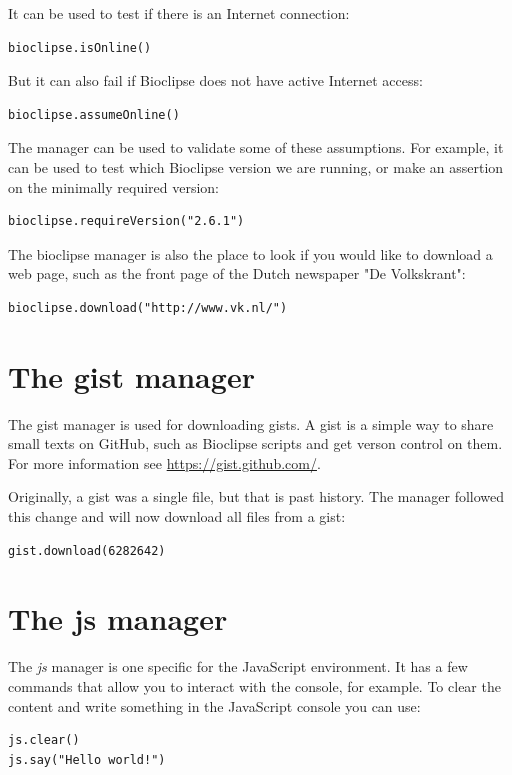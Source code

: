 \documentclass[a5paper, 10pt]{memoir}
\begin{document}
\begin{refsection}
It can be used to test if there is an Internet
connection:
\begin{Verbatim}
bioclipse.isOnline()
\end{Verbatim}
But it can also fail if Bioclipse does not have active Internet
access:
\begin{Verbatim}
bioclipse.assumeOnline()
\end{Verbatim}

The manager can be used to validate some of these assumptions. For example, it
can be used to test which Bioclipse version we are running, or make an
assertion on the minimally required version:
\begin{Verbatim}
bioclipse.requireVersion("2.6.1")
\end{Verbatim}
The bioclipse manager is also the place to look if you would like to download a
web page, such as the front page of the Dutch newspaper "De
Volkskrant":
\begin{Verbatim}
bioclipse.download("http://www.vk.nl/")
\end{Verbatim}


\section{The gist manager}

The gist manager is used for downloading gists. A gist is a simple way to share
small texts on GitHub, such as Bioclipse scripts and get verson
control on them. For more information see \url{https://gist.github.com/}.

Originally, a gist was a single file, but that is past history. The manager
followed this change and will now download all files from a
gist:

\begin{Verbatim}
gist.download(6282642)
\end{Verbatim}

\section{The js manager}
The \emph{js} manager is one specific for the JavaScript environment. It has a few
commands that allow you to interact with the console, for example. To clear the
content and write something in the JavaScript console you can use:
\begin{Verbatim}
js.clear()
js.say("Hello world!")
\end{Verbatim}


\end{refsection}
\end{document}
